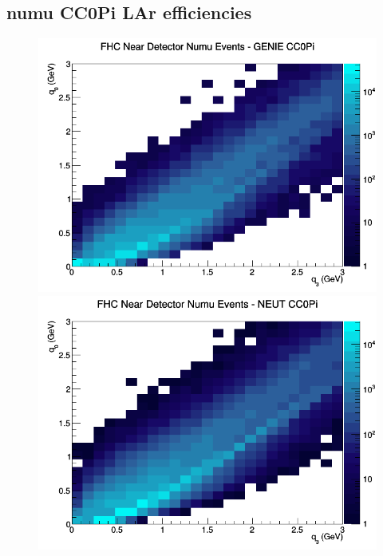 \documentclass[12pt]{article}
\begin{document}
\subsection{numu CC0Pi LAr efficiencies}
\begin{figure}[h]
\includegraphics[width=\linewidth]{eff_q0_q3/LAr/CC0Pi_FHC_ND_numu_q3_q0_GENIE.png}
\endminipage
{}
\includegraphics[width=\linewidth]{eff_q0_q3/LAr/CC0Pi_FHC_ND_numu_q3_q0_NEUT.png}
\endminipage
{}

\end{figure}
\end{document}
